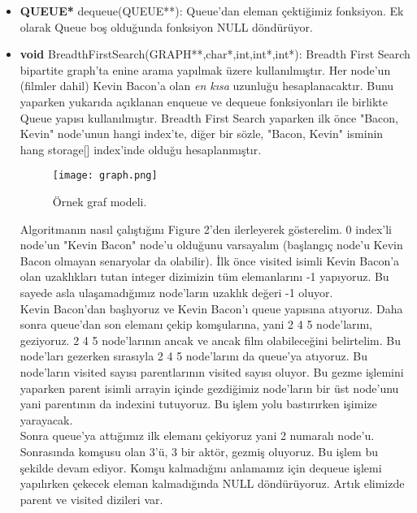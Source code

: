 \documentclass[11pt]{article}
\begin{document}
\begin{itemize}
	\item \textbf{QUEUE*} \textsf{dequeue(QUEUE**):} Queue'dan eleman çektiğimiz fonksiyon. Ek olarak Queue boş olduğunda fonksiyon NULL döndürüyor.
\\
	\item \textbf{void} \textsf{BreadthFirstSearch(GRAPH**,char*,int,int*,int*):} Breadth First Search bipartite graph'ta enine arama yapılmak üzere kullanılmıştır. Her node'un (filmler dahil) Kevin Bacon'a olan \textit{en kısa} uzunluğu hesaplanacaktır. Bunu yaparken yukarıda açıklanan \textsf{enqueue} ve \textsf{dequeue} fonksiyonları ile birlikte Queue yapısı kullanılmıştır.
Breadth First Search yaparken ilk önce "Bacon, Kevin" node'unun hangi index'te, diğer bir sözle, "Bacon, Kevin" isminin hang \textsf{storage[]} index'inde olduğu hesaplanmıştır.
\begin{figure}[H]
\centering
\texttt{[image: graph.png]}
\caption{Örnek graf modeli.}
\label{fig:figure3}
\end{figure}
Algoritmanın nasıl çalıştığını Figure 2'den ilerleyerek gösterelim. 0 index'li node'un "Kevin Bacon" node'u olduğunu varsayalım (başlangıç node'u Kevin Bacon olmayan senaryolar da olabilir). İlk önce \textsf{visited} isimli Kevin Bacon'a olan uzaklıkları tutan integer dizimizin tüm elemanlarını -1 yapıyoruz. Bu sayede asla ulaşamadığımız node'ların uzaklık değeri -1 oluyor.\\
Kevin Bacon'dan başlıyoruz ve Kevin Bacon'ı queue yapısına atıyoruz. Daha sonra queue'dan son elemanı çekip komşularına, yani 2 4 5 node'larını, geziyoruz. 2 4 5 node'larının ancak ve ancak film olabileceğini belirtelim. Bu node'ları gezerken sırasıyla 2 4 5 node'larını da queue'ya atıyoruz. Bu node'ların visited sayısı parentlarının visited sayısı oluyor. Bu gezme işlemini yaparken \textsf{parent} isimli arrayin içinde gezdiğimiz node'ların bir üst node'unu yani parentının da indexini tutuyoruz. Bu işlem yolu bastırırken işimize yarayacak.\\
Sonra queue'ya attığımız ilk elemanı çekiyoruz yani 2 numaralı node'u. Sonrasında komşusu olan 3'ü, 3 bir aktör, gezmiş oluyoruz. Bu işlem bu şekilde devam ediyor. Komşu kalmadığını anlamamız için dequeue işlemi yapılırken çekecek eleman kalmadığında NULL döndürüyoruz. Artık elimizde parent ve visited dizileri var.


\end{itemize}
\end{document}
